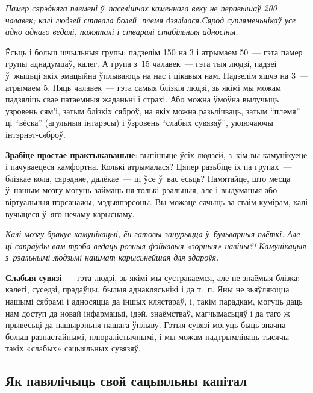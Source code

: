 \emph{Памер сярэдняга племені ў~паселішчах каменнага веку не перавышаў 200 чалавек; калі людзей ставала болей, племя дзялілася.Сярод супляменьнікаў усе адно аднаго ведалі, памяталі і стваралі стабільныя адносіны.}

Ёсьць і больш шчыльныя групы: падзелім 150 на 3 і атрымаем 50~--- гэта памер групы аднадумцаў, калег. А група з~15 чалавек~--- гэта тыя людзі, падзеі ў~жыцьці якіх эмацыйна ўплываюць на нас і цікавыя нам. Падзелім яшчэ на 3~--- атрымаем 5. Пяць чалавек~--- гэта самыя блізкія людзі, зь якімі мы можам падзяліць свае патаемныя жаданьні і страхі. Або можна ўмоўна вылучыць узровень сям'і, затым блізкіх сяброў, на якіх можна разьлічваць, затым ``племя'' ці ``вёска'' (агульныя інтарэсы) і ўзровень ``слабых сувязяў'', уключаючы інтэрнэт-сяброў.

\textbf{Зрабіце простае практыкаваньне}: выпішыце ўсіх людзей, з~кім вы камунікуеце і пачуваецеся камфортна. Колькі атрымалася? Цяпер разьбіце іх па групах~--- блізкае кола, сярэдняе, далёкае~--- ці ўсе ў~вас ёсьць? Памятайце, што месца ў~нашым мозгу могуць займаць ня толькі рэальныя, але і выдуманыя або віртуальныя пэрсанажы, мэдыяпэрсоны. Вы можаце сачыць за сваім кумірам, калі вучыцеся ў~яго нечаму карыснаму.

\emph{Калі мозгу бракуе камунікацыі, ён гатовы занурыцца ў~бульварныя плёткі. Але ці сапраўды вам трэба ведаць розныя фэйкавыя «зорныя» навіны?! Камунікацыя з~рэальнымі людзьмі нашмат карысьнейшая для здароўя.}


\textbf{Слабыя сувязі}~--- гэта людзі, зь якімі мы сустракаемся, але не знаёмыя блізка: калегі, суседзі, прадаўцы, былыя аднаклясьнікі і да т.~п. Яны не зьяўляюцца нашымі сябрамі і адносяцца да іншых клястараў, і, такім парадкам, могуць даць нам доступ да новай інфармацыі, ідэй, знаёмстваў, магчымасьцяў і да таго ж прывесьці да пашырэньня нашага ўплыву. Гэтыя сувязі могуць быць значна больш разнастайнымі, плюралістычнымі, і мы можам падтрымліваць тысячы такіх «слабых» сацыяльных сувязяў.

\subsection*{Як павялічыць свой сацыяльны капітал}


